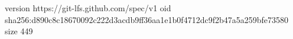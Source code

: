 version https://git-lfs.github.com/spec/v1
oid sha256:d890c8c18670092c222d3acdb9ff36aa1e1b0f4712dc9f2b47a5a259bfe73580
size 449
